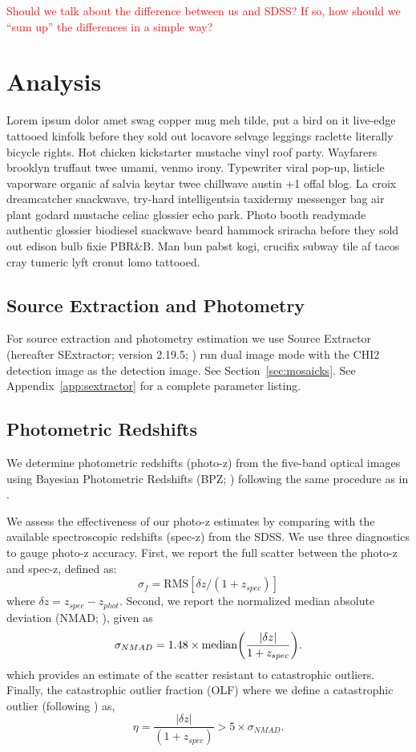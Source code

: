 \documentclass[apj, revtex4]{emulateapj}
\newcommand{\editorial}[1]{\textcolor{red}{#1}}
\begin{document}
\editorial{Should we talk about the difference between us and SDSS? If so, how should we ``sum up'' the differences in a simple way?} 

\section{Analysis}\label{sec:analysis}
Lorem ipsum dolor amet swag copper mug meh tilde, put a bird on it live-edge tattooed kinfolk before they sold out locavore selvage leggings raclette literally bicycle rights. Hot chicken kickstarter mustache vinyl roof party. Wayfarers brooklyn truffaut twee umami, venmo irony. Typewriter viral pop-up, listicle vaporware organic af salvia keytar twee chillwave austin +1 offal blog. La croix dreamcatcher snackwave, try-hard intelligentsia taxidermy messenger bag air plant godard mustache celiac glossier echo park. Photo booth readymade authentic glossier biodiesel snackwave beard hammock sriracha before they sold out edison bulb fixie PBR\&B. Man bun pabst kogi, crucifix subway tile af tacos cray tumeric lyft cronut lomo tattooed.

\subsection{Source Extraction and Photometry}
For source extraction and photometry estimation we use Source Extractor (hereafter SExtractor; version 2.19.5; \citealt{Bertin1996}) run dual image mode with the CHI2 detection image as the detection image. See Section~\ref{sec:mosaicks}. See Appendix~\ref{app:sextractor} for a complete parameter listing.

\subsection{Photometric Redshifts}
We determine photometric redshifts (photo-z) from the five-band optical images using Bayesian Photometric Redshifts (BPZ; \citealt{Benitez2000, Coe2006}) following the same procedure as in \cite{Menanteau2009a}.

We assess the effectiveness of our photo-z estimates by comparing with the available spectroscopic redshifts (spec-z) from the SDSS. We use three diagnostics to gauge photo-z accuracy. First, we report the full scatter between the photo-z and spec-z, defined as:
\begin{equation}
	\sigma_f = \mathrm{RMS}[\delta z/(1+z_{spec})]
\end{equation}
where $\delta z = z_{spec} - z_{phot}$. Second, we report the normalized median absolute deviation (NMAD; \citealt{Ilbert2009, Dahlen2013, Molino2017}), given as
\begin{equation}
	\sigma_{NMAD} = 1.48 \times \mathrm{median} \bigg{(} \frac{|\delta z|}{1+z_{spec}} \bigg{)}.
\end{equation}   
which provides an estimate of the scatter resistant to catastrophic outliers. Finally, the catastrophic outlier fraction (OLF) where we define a catastrophic outlier (following \citealt{Molino2017}) as,
\begin{equation}
	\eta = \frac{|\delta z|}{(1+z_{spec})} > 5 \times \sigma_{NMAD}.
\end{equation}
\end{document}
